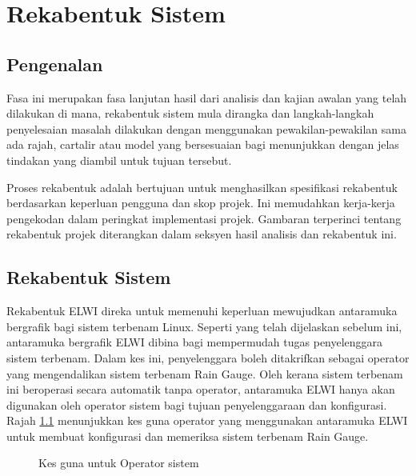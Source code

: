 \chapter{Rekabentuk Sistem}\label{c4}

\section{Pengenalan}
Fasa ini merupakan fasa lanjutan hasil dari analisis dan kajian awalan yang telah dilakukan di mana, rekabentuk sistem mula dirangka dan langkah-langkah penyelesaian masalah dilakukan dengan menggunakan pewakilan-pewakilan sama ada rajah, cartalir atau model yang bersesuaian bagi menunjukkan dengan jelas tindakan yang diambil untuk tujuan tersebut.

Proses rekabentuk adalah bertujuan untuk menghasilkan spesifikasi rekabentuk berdasarkan keperluan pengguna dan skop projek. Ini memudahkan kerja-kerja pengekodan dalam peringkat implementasi projek. Gambaran terperinci tentang rekabentuk projek diterangkan dalam seksyen hasil analisis dan rekabentuk ini.

\section{Rekabentuk Sistem}
Rekabentuk ELWI direka untuk memenuhi keperluan mewujudkan antaramuka bergrafik bagi sistem terbenam Linux. Seperti yang telah dijelaskan sebelum ini, antaramuka bergrafik ELWI dibina bagi mempermudah tugas penyelenggara sistem terbenam. Dalam kes ini, penyelenggara boleh ditakrifkan sebagai operator yang mengendalikan sistem terbenam Rain Gauge. Oleh kerana sistem terbenam ini beroperasi secara automatik tanpa operator, antaramuka ELWI hanya akan digunakan oleh operator sistem bagi tujuan penyelenggaraan dan konfigurasi. Rajah \ref{c4:f1} menunjukkan kes guna operator yang menggunakan antaramuka ELWI untuk membuat konfigurasi dan memeriksa sistem terbenam Rain Gauge.

\begin{figure}[!h]
\caption[Kes guna untuk Operator sistem]{Kes guna untuk Operator sistem}
\label{c4:f1}
\end{figure}

